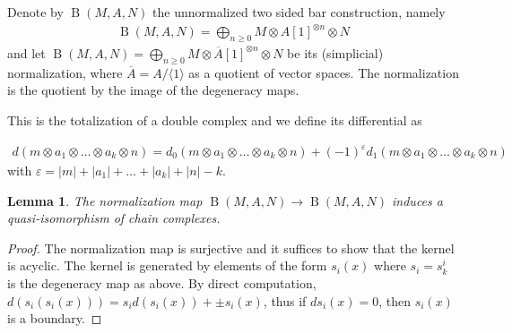 \documentclass{scrartcl}
\theoremstyle{plain}
\newtheorem{lemma}[theorem]{Lemma}
\theoremstyle{definition}
\renewcommand{\epsilon}{\varepsilon}
\newcommand{\abs}[1]{\left\lvert#1\right\rvert}
\DeclareMathOperator{\BC}{B}
\begin{document}
Denote by $\BC(M, A, N)$ the unnormalized two sided bar construction, namely 
\begin{align*}
    \BC(M, A, N) = \bigoplus_{n\geq 0} M\otimes A[1]^{\otimes n} \otimes N
\end{align*}
and let $\BC(M, A, N) = \bigoplus_{n\geq 0} M\otimes \overline {A}[1]^{\otimes n}\otimes N$ be its (simplicial) normalization, where $\overline A = A/\langle 1\rangle$ as a quotient of vector spaces. The normalization is the quotient by the image of the degeneracy maps. 

This is the totalization of a double complex and we define its differential as 

\begin{align*}
    d(m\otimes a_1\otimes \dots\otimes a_k\otimes n) = d_0(m\otimes a_1\otimes \dots\otimes a_k\otimes n) + (-1)^\epsilon d_1(m\otimes a_1\otimes \dots\otimes a_k\otimes n)
\end{align*}
with $\epsilon = \abs{m}+\abs{a_1}+\dots+\abs{a_{k}} + \abs{n} - k$.

\begin{lemma}\label{lem:bar-normalization}
    The normalization map $\BC(M, A, N)\to \BC(M, A, N)$ induces a quasi-isomorphism of chain complexes.
\end{lemma}
\begin{proof}
The normalization map is surjective and it suffices to show that the kernel is acyclic. The kernel is generated by elements of the form $s_i(x)$ where $s_i = s^i_k$ is the degeneracy map as above. By direct computation, $d(s_i(s_i(x))) = s_i d(s_i(x)) + \pm s_i(x)$, thus if $ds_i(x) = 0$, then $s_i(x)$ is a boundary.
\end{proof}
\end{document}
